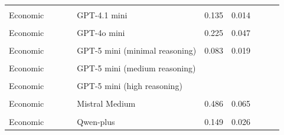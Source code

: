 \documentclass[
]{article}
\begin{document}
\begin{table}[!h]
{\begin{tabular}[t]{llrrlrrlrr}
\cellcolor{gray!10}{Moral} & \cellcolor{gray!10}{} & \cellcolor{gray!10}{} & \cellcolor{gray!10}{} & \cellcolor{gray!10}{GPT-4.1 mini} & \cellcolor{gray!10}{0.292} & \cellcolor{gray!10}{0.072} & \cellcolor{gray!10}{} & \cellcolor{gray!10}{} & \cellcolor{gray!10}{}\\
Economic &  &  &  & GPT-4.1 mini & 0.135 & 0.014 &  &  & \\
\cellcolor{gray!10}{Moral} & \cellcolor{gray!10}{} & \cellcolor{gray!10}{} & \cellcolor{gray!10}{} & \cellcolor{gray!10}{GPT-4o mini} & \cellcolor{gray!10}{2.000} & \cellcolor{gray!10}{0.290} & \cellcolor{gray!10}{} & \cellcolor{gray!10}{} & \cellcolor{gray!10}{}\\
Economic &  &  &  & GPT-4o mini & 0.225 & 0.047 &  &  & \\
\addlinespace
\cellcolor{gray!10}{Moral} & \cellcolor{gray!10}{} & \cellcolor{gray!10}{} & \cellcolor{gray!10}{} & \cellcolor{gray!10}{GPT-5 mini (minimal reasoning)} & \cellcolor{gray!10}{0.167} & \cellcolor{gray!10}{0.036} & \cellcolor{gray!10}{} & \cellcolor{gray!10}{} & \cellcolor{gray!10}{}\\
Economic &  &  &  & GPT-5 mini (minimal reasoning) & 0.083 & 0.019 &  &  & \\
\cellcolor{gray!10}{Moral} & \cellcolor{gray!10}{} & \cellcolor{gray!10}{} & \cellcolor{gray!10}{} & \cellcolor{gray!10}{GPT-5 mini (medium reasoning)} & \cellcolor{gray!10}{0.138} & \cellcolor{gray!10}{0.010} & \cellcolor{gray!10}{} & \cellcolor{gray!10}{} & \cellcolor{gray!10}{}\\
Economic &  &  &  & GPT-5 mini (medium reasoning) &  &  &  &  & \\
\cellcolor{gray!10}{Moral} & \cellcolor{gray!10}{} & \cellcolor{gray!10}{} & \cellcolor{gray!10}{} & \cellcolor{gray!10}{GPT-5 mini (high reasoning)} & \cellcolor{gray!10}{0.147} & \cellcolor{gray!10}{0.006} & \cellcolor{gray!10}{} & \cellcolor{gray!10}{} & \cellcolor{gray!10}{}\\
\addlinespace
Economic &  &  &  & GPT-5 mini (high reasoning) &  &  &  &  & \\
\cellcolor{gray!10}{Moral} & \cellcolor{gray!10}{} & \cellcolor{gray!10}{} & \cellcolor{gray!10}{} & \cellcolor{gray!10}{Mistral Medium} & \cellcolor{gray!10}{1.014} & \cellcolor{gray!10}{0.108} & \cellcolor{gray!10}{} & \cellcolor{gray!10}{} & \cellcolor{gray!10}{}\\
Economic &  &  &  & Mistral Medium & 0.486 & 0.065 &  &  & \\
\cellcolor{gray!10}{Moral} & \cellcolor{gray!10}{} & \cellcolor{gray!10}{} & \cellcolor{gray!10}{} & \cellcolor{gray!10}{Qwen-plus} & \cellcolor{gray!10}{0.364} & \cellcolor{gray!10}{0.057} & \cellcolor{gray!10}{} & \cellcolor{gray!10}{} & \cellcolor{gray!10}{}\\
Economic &  &  &  & Qwen-plus & 0.149 & 0.026 &  &  & \\
\bottomrule
\end{tabular}}
\end{table}
\end{document}
